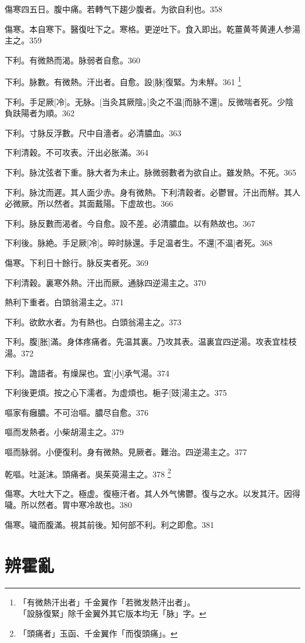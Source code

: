 \documentclass[12pt,oneside,UTF8,b5paper]{ctexbook}她她她她她她她
\begin{document}
傷寒四五日。腹中痛。若轉气下趨少腹者。为欲自利也。358

傷寒。本自寒下。醫復吐下之。寒格。更逆吐下。食入即出。乾薑黄芩黄連人参湯主之。359

下利。有微熱而渴。脉弱者自愈。360

下利。脉數。有微熱。汗出者。自愈。設[脉]復緊。为未觧。361
	\footnote{「有微熱汗出者」千金翼作「若微发熱汗出者」。\\「設脉復緊」除千金翼外其它版本均无「脉」字。}

下利。手足厥[冷]。无脉。[当灸其厥陰。]灸之不温[而脉不還]。反微喘者死。少陰負趺陽者为順。362

下利。寸脉反浮數。尺中自濇者。必清膿血。363

下利清穀。不可攻表。汗出必胀滿。364

下利。脉沈弦者下重。脉大者为未止。脉微弱數者为欲自止。雖发熱。不死。365

下利。脉沈而遲。其人面少赤。身有微熱。下利清穀者。必鬱冒。汗出而觧。其人必微厥。所以然者。其面戴陽。下虚故也。366

下利。脉反數而渴者。今自愈。設不差。必清膿血。以有熱故也。367

下利後。脉絶。手足厥[冷]。晬时脉還。手足温者生。不還[不温]者死。368

傷寒。下利日十餘行。脉反実者死。369

下利清穀。裏寒外熱。汗出而厥。通脉四逆湯主之。370

熱利下重者。白頭翁湯主之。371

下利。欲飲水者。为有熱也。白頭翁湯主之。373

下利。腹[胀]滿。身体疼痛者。先温其裏。乃攻其表。温裏宜四逆湯。攻表宜桂枝湯。372

下利。譫語者。有燥屎也。宜[小]承气湯。374

下利後更煩。按之心下濡者。为虚煩也。梔子[豉]湯主之。375

嘔家有癰膿。不可治嘔。膿尽自愈。376

嘔而发熱者。小柴胡湯主之。379

嘔而脉弱。小便復利。身有微熱。見厥者。難治。四逆湯主之。377

乾嘔。吐涎沫。頭痛者。吳茱萸湯主之。378
	\footnote{「頭痛者」玉函、千金翼作「而復頭痛」。}

傷寒。大吐大下之。極虚。復極汗者。其人外气怫鬱。復与之水。以发其汗。因得噦。所以然者。胃中寒冷故也。380

傷寒。噦而腹滿。視其前後。知何部不利。利之即愈。381

\chapter{辨霍亂}
\end{document}
